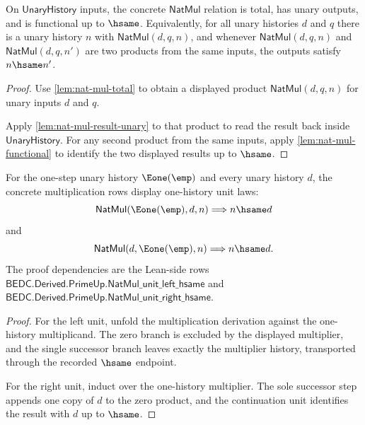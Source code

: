 \begin{theorem}
\label{thm:natmul-total-functional-law-surface}
On $\mathsf{UnaryHistory}$ inputs, the concrete $\mathsf{NatMul}$ relation is
total, has unary outputs, and is functional up to $\hsame$. Equivalently, for
all unary histories $d$ and $q$ there is a unary history $n$ with
$\mathsf{NatMul}(d,q,n)$, and whenever $\mathsf{NatMul}(d,q,n)$ and
$\mathsf{NatMul}(d,q,n')$ are two products from the same inputs, the outputs
satisfy $n\hsame n'$.
\end{theorem}
\begin{proof}
Use \autoref{lem:nat-mul-total} to obtain a displayed product
$\mathsf{NatMul}(d,q,n)$ for unary inputs $d$ and $q$.

Apply \autoref{lem:nat-mul-result-unary} to that product to read the result
back inside $\mathsf{UnaryHistory}$. For any second product from the same
inputs, apply \autoref{lem:nat-mul-functional} to identify the two displayed
results up to $\hsame$.
\end{proof}

\begin{theorem}
\label{thm:natmul-unit-law-surface}
For the one-step unary history $\Eone(\emp)$ and every unary history $d$, the
concrete multiplication rows display one-history unit laws:
$$
\mathsf{NatMul}(\Eone(\emp),d,n)\Longrightarrow n\hsame d
$$
and
$$
\mathsf{NatMul}(d,\Eone(\emp),n)\Longrightarrow n\hsame d.
$$
The proof dependencies are the Lean-side rows
$\mathsf{BEDC.Derived.PrimeUp.NatMul\_unit\_left\_hsame}$ and
$\mathsf{BEDC.Derived.PrimeUp.NatMul\_unit\_right\_hsame}$.
\end{theorem}
\begin{proof}
For the left unit, unfold the multiplication derivation against the one-history
multiplicand. The zero branch is excluded by the displayed multiplier, and the
single successor branch leaves exactly the multiplier history, transported
through the recorded $\hsame$ endpoint.

For the right unit, induct over the one-history multiplier. The sole successor
step appends one copy of $d$ to the zero product, and the continuation unit
identifies the result with $d$ up to $\hsame$.
\end{proof}

